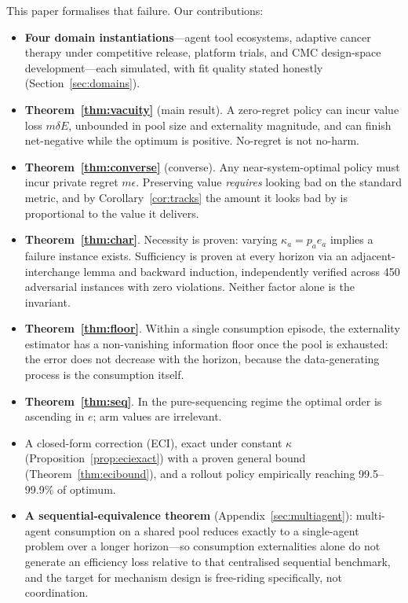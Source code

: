 This paper formalises that failure. Our contributions:

\begin{itemize}
\item \textbf{Four domain instantiations}---agent tool ecosystems, adaptive cancer
therapy under competitive release, platform trials, and CMC design-space
development---each simulated, with fit quality stated honestly
(Section~\ref{sec:domains}).
\item \textbf{Theorem~\ref{thm:vacuity}} (main result). A zero-regret policy can
incur value loss $m\delta E$, unbounded in pool size and externality magnitude, and
can finish net-negative while the optimum is positive. No-regret is not no-harm.
\item \textbf{Theorem~\ref{thm:converse}} (converse). Any near-system-optimal policy
must incur private regret $m\epsilon$. Preserving value \emph{requires} looking bad
on the standard metric, and by Corollary~\ref{cor:tracks} the amount it looks bad by
is proportional to the value it delivers.
\item \textbf{Theorem~\ref{thm:char}}. Necessity is proven: varying $\kappa_a =
p_a e_a$ implies a failure instance exists. Sufficiency is proven at every
horizon via an adjacent-interchange lemma and backward induction, independently
verified across 450 adversarial instances with zero violations. Neither factor
alone is the invariant.
\item \textbf{Theorem~\ref{thm:floor}}. Within a single consumption episode, the
externality estimator has a non-vanishing information floor once the pool is
exhausted: the error does not decrease with the horizon, because the
data-generating process is the consumption itself.
\item \textbf{Theorem~\ref{thm:seq}}. In the pure-sequencing regime the optimal
order is ascending in $e$; arm values are irrelevant.
\item A closed-form correction (ECI), exact under constant $\kappa$
(Proposition~\ref{prop:eciexact}) with a proven general bound
(Theorem~\ref{thm:ecibound}), and a rollout policy empirically reaching 99.5--99.9\% of
optimum.
\item \textbf{A sequential-equivalence theorem} (Appendix~\ref{sec:multiagent}): multi-agent consumption on a
shared pool reduces exactly to a single-agent problem over a longer horizon---so consumption externalities
alone do not generate an efficiency loss relative to that centralised sequential benchmark, and the target
for mechanism design is free-riding specifically, not coordination.

\end{itemize}
